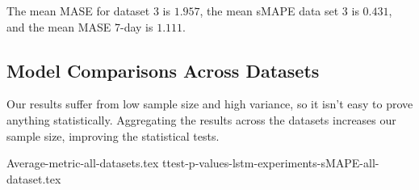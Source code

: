 The mean MASE for dataset 3 is $1.957$,
the mean sMAPE data set 3 is $0.431$,
and the mean MASE 7-day is $1.111$.




\subsection{Model Comparisons Across Datasets}
Our results suffer from low sample size and high variance, so it isn't easy
to prove anything statistically. Aggregating the results across the datasets
increases our sample size, improving the statistical tests.

{Average-metric-all-datasets.tex}
{ttest-p-values-lstm-experiments-sMAPE-all-dataset.tex}
